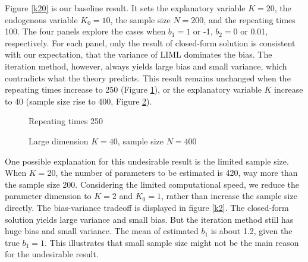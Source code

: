 \documentclass[12pt,pdftex,letterpaper]{article}
\begin{document}
\indent Figure \ref{k20} is our baseline result. It sets the explanatory variable $K=20$, the endogenous variable $K_0=10$, the sample size $N=200$, and the repeating times 100. The four panels explore the cases when $b_1=1$ or -1, $b_2=0$ or 0.01, respectively. For each panel, only the result of closed-form solution is consistent with our expectation, that the variance of LIML dominates the bias. The iteration method, however, always yields large bias and small variance, which contradicts what the theory predicts. This result remains unchanged when the repeating times increase to 250 (Figure \ref{rep250}), or the explanatory variable $K$ increase to 40 (sample size rise to 400, Figure \ref{k40}).

\begin{figure}[h]
\centering
{}
\caption{Repeating times 250}\label{rep250}
\end{figure}

\begin{figure}[h]
\centering
{}
\caption{Large dimension $K=40$, sample size $N=400$}\label{k40}
\end{figure}

\indent One possible explanation for this undesirable result is the limited sample size. When $K=20$, the number of parameters to be estimated is 420, way more than the sample size 200. Considering the limited computational speed, we reduce the parameter dimension to $K=2$ and $K_0=1$, rather than increase the sample size directly. The bias-variance tradeoff is displayed in figure \ref{k2}. The closed-form solution yields large variance and small bias. But the iteration method still has huge bias and small variance. The mean of estimated $b_1$ is about 1.2, given the true $b_1=1$. This illustrates that small sample size might not be the main reason for the undesirable result.
\end{document}
